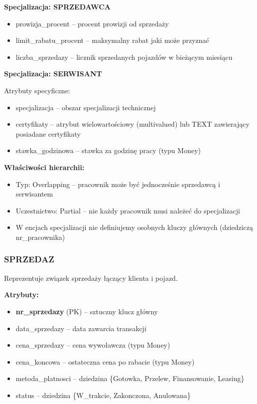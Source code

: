 \documentclass[a4paper,titleauthor]{mwart}
\begin{document}
	\textbf{Specjalizacja: SPRZEDAWCA}
	
	\begin{itemize}
		\item prowizja\_procent -- procent prowizji od sprzedaży
		\item limit\_rabatu\_procent -- maksymalny rabat jaki może przyznać
		\item liczba\_sprzedazy -- licznik sprzedanych pojazdów w bieżącym miesiącu
	\end{itemize}
	
	\textbf{Specjalizacja: SERWISANT}
	
	Atrybuty specyficzne:
	\begin{itemize}
		\item specjalizacja -- obszar specjalizacji technicznej
		\item certyfikaty -- atrybut wielowartościowy (multivalued) lub TEXT zawierający posiadane certyfikaty
		\item stawka\_godzinowa -- stawka za godzinę pracy (typu Money)
	\end{itemize}
	
	\textbf{Właściwości hierarchii:}
	\begin{itemize}
		\item Typ: Overlapping -- pracownik może być jednocześnie sprzedawcą i serwisantem
		\item Uczestnictwo: Partial -- nie każdy pracownik musi należeć do specjalizacji
		\item W encjach specjalizacji nie definiujemy osobnych kluczy głównych (dziedziczą nr\_pracownika)
	\end{itemize}
	
	\subsubsection{SPRZEDAZ}
	
	Reprezentuje związek sprzedaży łączący klienta i pojazd.
	
	\textbf{Atrybuty:}
	\begin{itemize}
		\item \textbf{nr\_sprzedazy} (PK) -- sztuczny klucz główny
		\item data\_sprzedazy -- data zawarcia transakcji
		\item cena\_sprzedazy -- cena wywoławcza (typu Money)
		\item cena\_koncowa -- ostateczna cena po rabacie (typu Money)
		\item metoda\_platnosci -- dziedzina \{Gotowka, Przelew, Finansowanie, Leasing\}
		\item status -- dziedzina \{W\_trakcie, Zakonczona, Anulowana\}
	\end{itemize}
	
\end{document}
